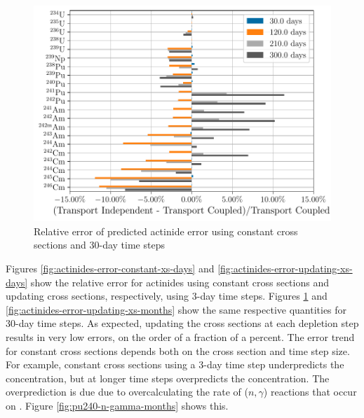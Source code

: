     \begin{figure}[h!tpb]
        \centering
        \includegraphics[width=\linewidth]{figs/actinides_constant_xs_predictor_fission_q_months.pdf}
        \caption{Relative error of predicted actinide error using
        constant cross sections and 30-day time steps}
        \label{fig:actinides-error-constant-xs-months}
    \end{figure}

    Figures \ref{fig:actinides-error-constant-xs-days} and
    \ref{fig:actinides-error-updating-xs-days} show the relative error for
    actinides using constant cross sections and updating cross sections,
    respectively, using 3-day time steps. Figures
    \ref{fig:actinides-error-constant-xs-months} and
    \ref{fig:actinides-error-updating-xs-months} show the same respective
    quantities for 30-day time steps. As expected, updating the cross sections at
    each depletion step results in very low errors, on the order of a fraction
    of a percent. The error trend for constant cross sections depends both on
    the cross section and time step size. For example, constant cross sections
    using a 3-day time step underpredicts the  concentration, but at
    longer time steps overpredicts the concentration. The overprediction is due
    due to overcalculating the rate of ($n,\gamma$) reactions that occur on
    . Figure \ref{fig:pu240-n-gamma-months} shows this.

